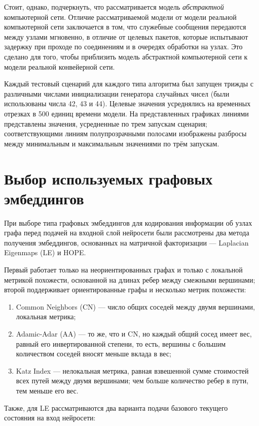\documentclass[specification,annotation,times]{itmo-student-thesis}
\theoremstyle{definition}
\begin{document}
Стоит, однако, подчеркнуть, что рассматривается модель \textit{абстрактной}
компьютерной сети. Отличие рассматриваемой модели от модели реальной
компьютерной сети заключается в том, что служебные сообщения передаются между
узлами мгновенно, в отличие от целевых пакетов, которые испытывают задержку при
проходе по соединениям и в очередях обработки на узлах. Это сделано для того,
чтобы приблизить модель абстрактной компьютерной сети к модели реальной
конвейерной сети.

Каждый тестовый сценарий для каждого типа алгоритма был запущен трижды с
различными числами инициализации генератора случайных чисел (были использованы
числа 42, 43 и 44). Целевые значения усреднялись на временных отрезках в 500
единиц времени модели. На представленных графиках линиями представлены значения,
усредненные по трем запускам сценария; соответствующими линиям полупрозрачными
полосами изображены разбросы между минимальным и максимальным значениями по трём
запускам.

\section{Выбор используемых графовых эмбеддингов}\label{experiments:embeddings}

При выборе типа графовых эмбеддингов для кодирования информации об узлах графа
перед подачей на входной слой нейросети были рассмотрены два метода получения
эмбеддингов, основанных на матричной факторизации --- Laplacian Eigenmaps (LE) и
HOPE.

Первый работает только на неориентированных графах и только с локальной метрикой
похожести, основанной на длинах ребер между смежными вершинами; второй
поддерживает ориентированные графы и несколько метрик похожести:

\begin{enumerate}
\item Common Neighbors (CN) --- число общих соседей между двумя вершинами,
  локальная метрика;
\item Adamic-Adar (AA) --- то же, что и CN, но каждый общий сосед имеет вес,
  равный его инвертированной степени, то есть, вершины с большим количеством
  соседей вносят меньше вклада в вес;
\item Katz Index --- нелокальная метрика, равная взвешенной сумме стоимостей
  всех путей между двумя вершинами; чем больше количество ребер в пути, тем
  меньше его вес.
\end{enumerate}

Также, для LE рассматриваются два варианта подачи базового текущего состояния на
вход нейросети:
\end{document}
